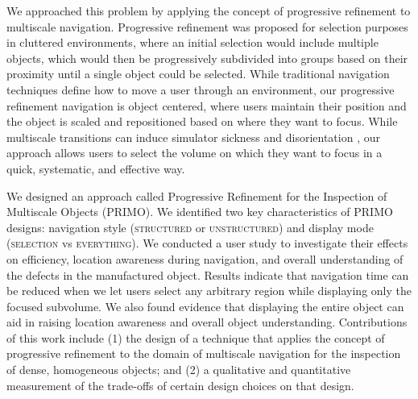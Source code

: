 We approached this problem by applying the concept of progressive refinement to multiscale navigation. Progressive refinement \cite{kopper_rapid_2011} was proposed for selection purposes in cluttered environments, where an initial selection would include multiple objects, which would then be progressively subdivided into groups based on their proximity until a single object could be selected. While traditional navigation techniques define how to move a user through an environment, our progressive refinement navigation is object centered, where users maintain their position and the object is scaled and repositioned based on where they want to focus. While multiscale transitions can induce simulator sickness and disorientation \cite{krekhov_gullivr_2018, piumsomboon_superman_2018, cmentowski_outstanding_2019, abtahi_im_2019}, our approach allows users to select the volume on which they want to focus in a quick, systematic, and effective way.

We designed an approach called Progressive Refinement for the Inspection of Multiscale Objects (PRIMO). We identified two key characteristics of PRIMO designs: navigation style (\textsc{structured} or \textsc{unstructured}) and display mode (\textsc{selection} vs \textsc{everything}). We conducted a user study to investigate their effects on efficiency, location awareness during navigation, and overall understanding of the defects in the manufactured object. Results indicate that navigation time can be reduced when we let users select any arbitrary region while displaying only the focused subvolume. We also found evidence that displaying the entire object can aid in raising location awareness and overall object understanding. Contributions of this work include (1) the design of a technique that applies the concept of progressive refinement to the domain of multiscale navigation for the inspection of dense, homogeneous objects; and (2) a qualitative and quantitative measurement of the trade-offs of certain design choices on that design.
